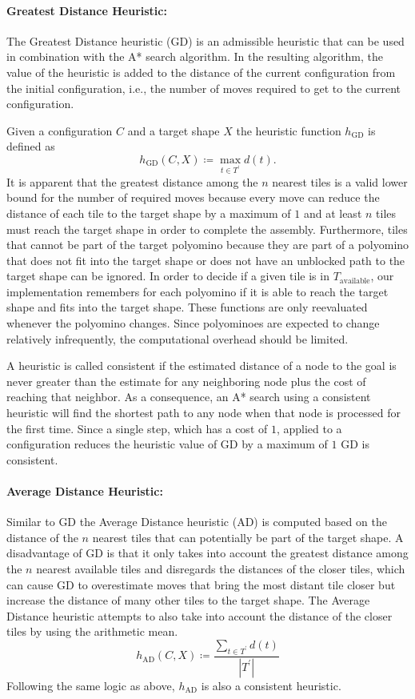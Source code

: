\paragraph{Greatest Distance Heuristic:}
The Greatest Distance heuristic (GD) is an admissible heuristic that can be used in combination with the A* search algorithm. In the resulting algorithm, the value of the heuristic is added to the distance of the current configuration from the initial configuration, i.e., the number of moves required to get to the current configuration. \par
Given a configuration $C$ and a target shape $X$ the heuristic function $h_{\text{GD}}$ is defined as
\begin{equation}
h_{\text{GD}}(C, X) \coloneqq \max_{t \in T^\prime}{d(t)}.
\end{equation}
It is apparent that the greatest distance among the $n$ nearest tiles is a valid lower bound for the number of required moves because every move can reduce the distance of each tile to the target shape by a maximum of $1$ and at least $n$ tiles must reach the target shape in order to complete the assembly. Furthermore, tiles that cannot be part of the target polyomino because they are part of a polyomino that does not fit into the target shape or does not have an unblocked path to the target shape can be ignored. In order to decide if a given tile is in $T_{\text{available}}$, our implementation remembers for each polyomino if it is able to reach the target shape and fits into the target shape. These functions are only reevaluated whenever the polyomino changes. Since polyominoes are expected to change relatively infrequently, the computational overhead should be limited. \par
A heuristic is called consistent if the estimated distance of a node to the goal is never greater than the estimate for any neighboring node plus the cost of reaching that neighbor. As a consequence, an A* search using a consistent heuristic will find the shortest path to any node when that node is processed for the first time. Since a single step, which has a cost of $1$, applied to a configuration reduces the heuristic value of GD by a maximum of $1$ GD is consistent.
\paragraph{Average Distance Heuristic:}
Similar to GD the Average Distance heuristic (AD) is computed based on the distance of the $n$ nearest tiles that can potentially be part of the target shape. A disadvantage of GD is that it only takes into account the greatest distance among the $n$ nearest available tiles and disregards the distances of the closer tiles, which can cause GD to overestimate moves that bring the most distant tile closer but increase the distance of many other tiles to the target shape. The Average Distance heuristic attempts to also take into account the distance of the closer tiles by using the arithmetic mean.
\begin{equation}
h_{\text{AD}}(C, X) \coloneqq \dfrac {\sum_{t \in T^\prime}{d(t)}} {|T^\prime|}
\end{equation}
Following the same logic as above, $h_{\text{AD}}$ is also a consistent heuristic.

